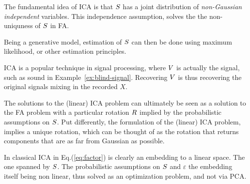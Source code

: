 \documentclass[12pt,a4paper]{article}
\begin{document}
The fundamental idea of ICA is that $S$ has a joint distribution of \emph{non-Gaussian independent} variables. 
This independence assumption, solves the the non-uniquness of $S$ in FA.

Being a generative model, estimation of $S$ can then be done using maximum likelihood, or other estimation principles. 

ICA is a popular technique in signal processing, where $V$ is actually the signal, such as sound in Example~\ref{ex:blind-signal}.
Recovering $V$ is thus recovering the original signals mixing in the recorded $X$. 



\begin{remark}
	The solutions to the (linear) ICA problem can ultimately be seen as a solution to the FA problem with a particular rotation $R$ implied by the probabilistic assumptions on $S$.
	Put differently, the formulation of the (linear) ICA problem, implies a unique rotation, which can be thought of as the rotation that returns components that are as far from Gaussian as possible. 
\end{remark}


\begin{remark}
	In classical ICA in Eq.(\ref{eq:factor}) is clearly an embedding to a linear space. 
	The one spanned by $S$. 
	The probabilistic assumptions on $S$ and $\varepsilon$ the embedding itself being non linear, thus solved as an optimization problem, and not via PCA. 
\end{remark}
\end{document}

